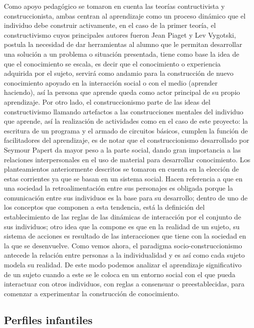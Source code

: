 \documentclass[letterpaper,10pt]{article}
\begin{document}
Como apoyo pedagógico se tomaron en cuenta las teorías contructivista y
construccionista, ambas centran al aprendizaje como un  proceso dinámico que el individuo
debe construir activamente, en el caso de la primer teoría, el constructivismo
cuyos principales autores fueron Jean Piaget y Lev Vygotski, postula la
necesidad de dar herramientas al alumno  que le permitan desarrollar
una solución a un problema o situación presentada, tiene como base la idea de
que el conocimiento se escala, es decir que el conocimiento o experiencia
adquirida por el sujeto, servirá como andamio para la construcción de nuevo
conocimiento apoyado en la interacción social o con el medio (aprender haciendo), 
así la persona que aprende queda como actor principal de su propio
aprendizaje. Por otro lado, el construccionismo parte de las ideas del
constructivismo llamando artefactos a las construcciones mentales del individuo
que aprende, así la realización de  actividades como en el caso de
este proyecto: la escritura de un programa y el armado de circuitos básicos,
cumplen la función de facilitadores del aprendizaje, es de notar que el
construccionismo desarrollado por Seymour Papert  da mayor peso a la parte social, dando gran importancia a
las relaciones interpersonales en el uso de material para desarrollar
conocimiento.\newline
Los planteamientos anteriormente descritos se tomaron en cuenta en la elección de estas
corrientes ya que se basan en un sistema social. Hacen referencia a que en una sociedad
la retroalimentación entre sus personajes es obligada porque la comunicación entre 
sus individuos es la base para su desarrollo; dentro de uno de los conceptos que componen 
a esta tendencia, está la definición del establecimiento de las reglas de las 
dinámicas de interacción por el conjunto de sus individuos; otro idea que la 
compone es que en la realidad de un sujeto, su sistema de acciones es
resultado de las interacciones que tiene con la sociedad en la que se desenvuelve. 
Como vemos ahora, el paradigma socio-construccionismo antecede la 
relación entre personas a la individualidad y es así como cada sujeto modela su 
realidad. De este modo podemos analizar el aprendizaje significativo de un
sujeto cuando a este se le coloca en un entorno social con el que pueda interactuar
con otros individuos, con reglas a consensuar o preestablecidas, para comenzar
a experimentar la construcción de conocimiento.


\subsection{Perfiles infantiles}
\end{document}
